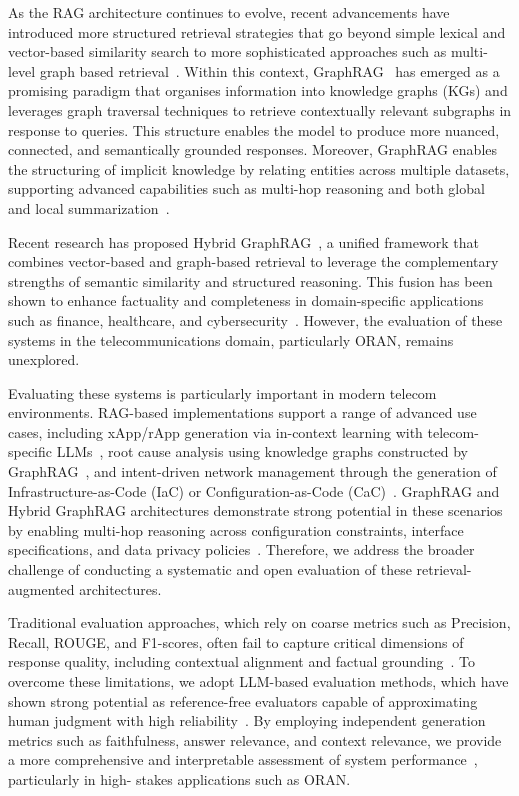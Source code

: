 \documentclass[10pt, conference]{IEEEtran}
\begin{document}
As the RAG architecture continues to evolve, recent advancements have introduced more structured retrieval strategies that go beyond simple lexical and vector-based similarity search to more sophisticated approaches such as multi-level graph based retrieval~\cite{chen2024knowledge}. Within this context, GraphRAG~\cite{edge2024local} has emerged as a promising paradigm that organises information into knowledge graphs (KGs) and leverages graph traversal techniques to retrieve contextually relevant subgraphs in response to queries. This structure enables the model to produce more nuanced, connected, and semantically grounded responses. Moreover, GraphRAG enables the structuring of implicit knowledge by relating entities across multiple datasets, supporting advanced capabilities such as multi-hop reasoning and both global and local summarization~\cite{edge2024local}.

Recent research has proposed Hybrid GraphRAG~\cite{sarmah2024hybridrag}, a unified framework that combines vector-based and graph-based retrieval to leverage the complementary strengths of semantic similarity and structured reasoning. This fusion has been shown to enhance factuality and completeness in domain-specific applications such as finance, healthcare, and cybersecurity~\cite{zhang2025survey}. However, the evaluation of these systems in the telecommunications domain, particularly ORAN, remains unexplored.

Evaluating these systems is particularly important in modern telecom environments. RAG-based implementations support a range of advanced use cases, including xApp/rApp generation via in-context learning with telecom-specific LLMs~\cite{wu2025llm}, root cause analysis using knowledge graphs constructed by GraphRAG~\cite{yuan2025enhancing}, and intent-driven network management through the generation of Infrastructure-as-Code (IaC) or Configuration-as-Code (CaC)~\cite{dzeparoska2023llm}. GraphRAG and Hybrid GraphRAG architectures demonstrate strong potential in these scenarios by enabling multi-hop reasoning across configuration constraints, interface specifications, and data privacy policies~\cite{xiong2024graph}. Therefore, we address the broader challenge of conducting a systematic and open evaluation of these retrieval-augmented architectures.

Traditional evaluation approaches, which rely on coarse metrics such as Precision, Recall, ROUGE, and F1-scores, often fail to capture critical dimensions of response quality, including contextual alignment and factual grounding~\cite{yu2024evaluation}. To overcome these limitations, we adopt LLM-based evaluation methods, which have shown strong potential as reference-free evaluators capable of approximating human judgment with high reliability~\cite{zheng2023judging}. By employing independent generation metrics such as faithfulness, answer relevance, and context relevance, we provide a more comprehensive and interpretable assessment of system performance~\cite{es2024ragas}, particularly in high-
stakes applications such as ORAN.
\end{document}
